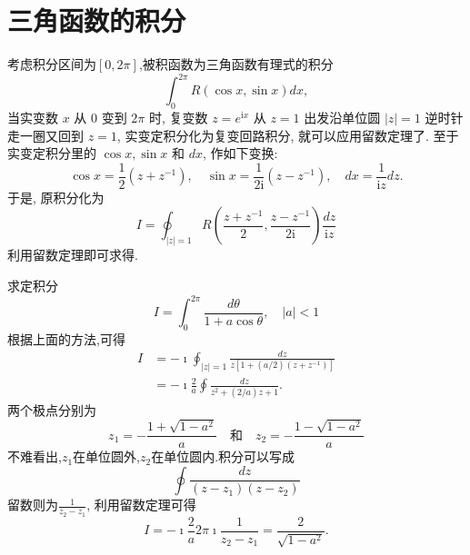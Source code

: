 \section{三角函数的积分}
考虑积分区间为$\left[ 0, 2\pi \right]$,被积函数为三角函数有理式的积分
\begin{equation}
    \int_{0}^{2\pi} R(\cos{x}, \sin{x}) dx,
\end{equation}
当实变数 $x$ 从 0 变到 $2 \pi$ 时, 复变数 $z=e^{\mathrm{i} x}$ 从 $z=1$ 出发沿单位圆 $|z|=1$ 逆时针 走一圈又回到 $z=1$,
实变定积分化为复变回路积分, 就可以应用留数定理了. 至于实变定积分里的 $\cos x, \sin x$ 和 $d x$, 作如下变换:
$$
\cos x=\frac{1}{2}\left(z+z^{-1}\right), \quad \sin x=\frac{1}{2 \mathrm{i}}\left(z-z^{-1}\right), \quad d x=\frac{1}{\mathrm{i} z} d z .
$$
于是, 原积分化为
$$
I=\oint_{|z|=1} R\left(\frac{z+z^{-1}}{2}, \frac{z-z^{-1}}{2 \mathrm{i}}\right) \frac{d z}{\mathrm{i} z}
$$
利用留数定理即可求得.

\begin{examplebox}{求定积分\[I=\int_0^{2 \pi} \frac{d \theta}{1+a \cos \theta}, \quad|a|<1 \]}
    根据上面的方法,可得
    \[
        \begin{aligned}
        I & =-\imath \oint_{|z|=1} \frac{d z}{z\left[1+(a / 2)\left(z+z^{-1}\right)\right]} \\
        & =-\imath \frac{2}{a} \oint \frac{d z}{z^2+(2 / a) z+1} .
        \end{aligned}
    \]
    两个极点分别为
    \[
        z_1=-\frac{1+\sqrt{1-a^2}}{a} \quad \text {和} \quad z_2=-\frac{1-\sqrt{1-a^2}}{a}
    \]
    不难看出,$z_1$在单位圆外,$z_2$在单位圆内.积分可以写成
    \[
      \oint \frac{dz}{(z-z_1)(z-z_2)}   
    \]
    留数则为$\frac{1}{z_2 - z_1}$, 利用留数定理可得 
    \[
      I=  -\imath \frac{2}{a} 2\pi\imath \frac{1}{z_2 - z_1} = \frac{2}{\sqrt{1 - a^2}} . 
    \]
\end{examplebox}




